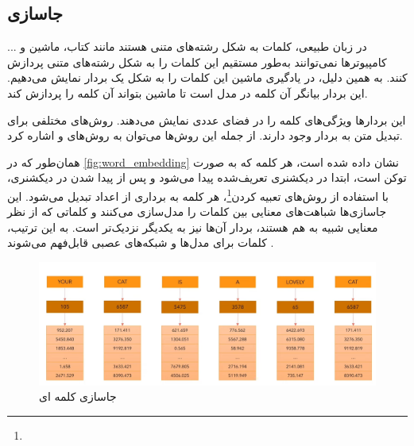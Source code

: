 \subsection{جاسازی}
در زبان طبیعی، کلمات به شکل رشته‌های متنی هستند مانند کتاب، ماشین و ... کامپیوترها نمی‌توانند به‌طور مستقیم این کلمات را به شکل رشته‌های متنی پردازش کنند. به همین دلیل، در یادگیری ماشین این کلمات را به شکل یک بردار نمایش می‌دهیم. این بردار بیانگر آن کلمه در مدل است تا ماشین بتواند آن کلمه را پردازش کند.

این بردارها ویژگی‌های کلمه را در فضای عددی نمایش می‌دهند. روش‌های مختلفی برای تبدیل متن به بردار وجود دارند. از جمله این روش‌ها می‌توان به روش‌های  \cite{mikolov2013distributed} و  \cite{pennington2014glove} اشاره کرد.

همان‌طور که در \autoref{fig:word_embedding} نشان داده شده است، هر کلمه که به صورت توکن است، ابتدا در دیکشنری تعریف‌شده پیدا می‌شود و پس از پیدا شدن در دیکشنری، با استفاده از روش‌های تعبیه کردن\footnote{}، هر کلمه به برداری از اعداد تبدیل می‌شود. این جاسازی‌ها شباهت‌های معنایی بین کلمات را مدل‌سازی می‌کنند و کلماتی که از نظر معنایی شبیه به هم هستند، بردار آن‌ها نیز به یکدیگر نزدیک‌تر است. به این ترتیب، کلمات برای مدل‌ها و شبکه‌های عصبی قابل‌فهم می‌شوند \cite{mikolov2013distributed,pennington2014glove}.





 \begin{figure}[h]
 	\centering
 	\begin{minipage}[b]{0.7\textwidth}
 		\centering
 		\includegraphics[width=\textwidth]{transformer_images/word_embedding.png}
 		\caption{جاسازی کلمه ای}
 		\label{fig:word_embedding}
 	\end{minipage}
 	\hfill
 \end{figure}
 
 
 

 
 
 
 




